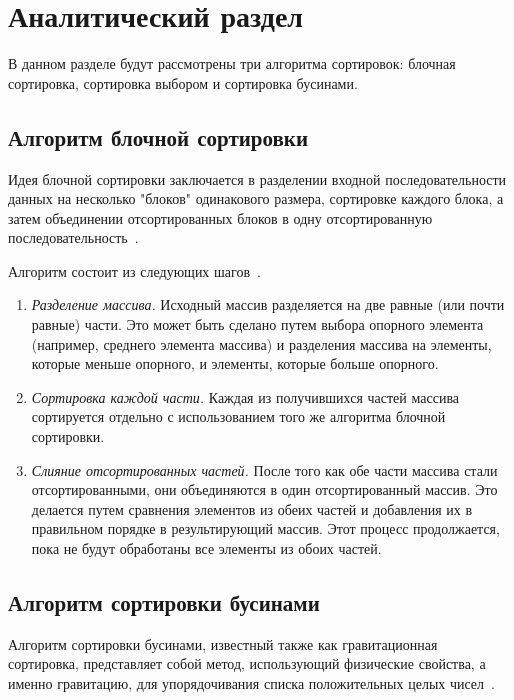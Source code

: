 \chapter{Аналитический раздел}

В данном разделе будут рассмотрены три алгоритма сортировок: блочная сортировка, сортировка выбором
и сортировка бусинами.

\section{Алгоритм блочной сортировки}

Идея блочной сортировки заключается в разделении входной последовательности данных на несколько "блоков" одинакового размера, сортировке каждого блока, а затем объединении отсортированных блоков в одну отсортированную последовательность~\cite{sort_report}.

Алгоритм состоит из следующих шагов~\cite{sort_report}.

\begin{enumerate}
	\item \textit{Разделение массива.} Исходный массив разделяется на две равные (или почти равные) части. Это может быть сделано путем выбора опорного элемента (например, среднего элемента массива) и разделения массива на элементы, которые меньше опорного, и элементы, которые больше опорного.
	
	\item \textit{Сортировка каждой части.} Каждая из получившихся частей массива сортируется отдельно с использованием того же алгоритма блочной сортировки.
	
	\item \textit{Слияние отсортированных частей.} После того как обе части массива стали отсортированными, они объединяются в один отсортированный массив. Это делается путем сравнения элементов из обеих частей и добавления их в правильном порядке в результирующий массив. Этот процесс продолжается, пока не будут обработаны все элементы из обоих частей.
	
\end{enumerate}

\section{Алгоритм сортировки бусинами}

Алгоритм сортировки бусинами, известный также как гравитационная сортировка, представляет собой метод, использующий физические свойства, а именно гравитацию, для упорядочивания списка положительных целых чисел~\cite{article_bead}.

